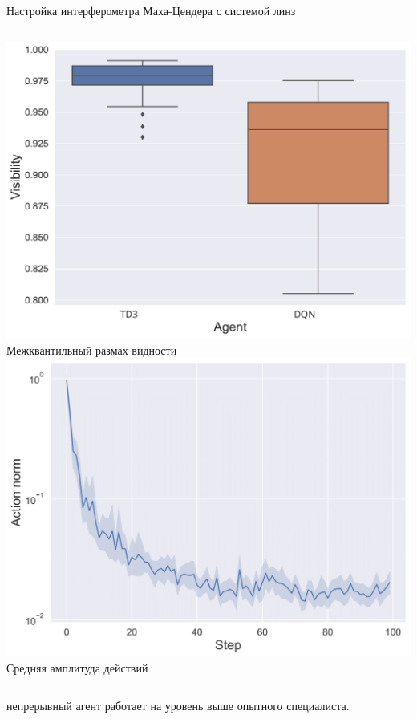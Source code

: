 \begin{frame}[allowframebreaks]{Настройка интерферометра Маха-Цендера с системой линз}
\framebreak 

\begin{columns}
\centering
\includegraphics[width=1\linewidth]{images/DQN_vs_TD3_box.pdf}
Межквантильный размах видности
\centering
\includegraphics[width=1\linewidth]{Presentation/images/action_norm_decrease.png}
Средняя амплитуда действий
\end{columns}

\vspace{10pt}
 непрерывный агент работает на уровень выше опытного специалиста.

\framebreak


\end{frame}
